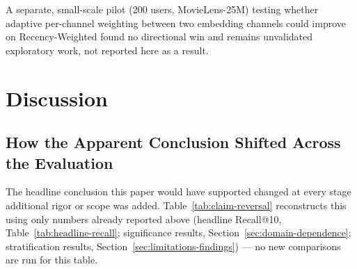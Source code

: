 \documentclass[11pt,a4paper]{article}
\begin{document}
A separate, small-scale pilot (200 users, MovieLens-25M) testing whether
adaptive per-channel weighting between two embedding channels could
improve on Recency-Weighted found no directional win and remains
unvalidated exploratory work, not reported here as a result.

\section{Discussion}

\subsection{How the Apparent Conclusion Shifted Across the Evaluation}
\label{sec:claim-reversal}

The headline conclusion this paper would have supported changed at every
stage additional rigor or scope was added. Table~\ref{tab:claim-reversal}
reconstructs this using only numbers already reported above (headline
Recall@10, Table~\ref{tab:headline-recall}; significance results,
Section~\ref{sec:domain-dependence}; stratification results,
Section~\ref{sec:limitations-findings}) --- no new comparisons are run for
this table.
\end{document}
